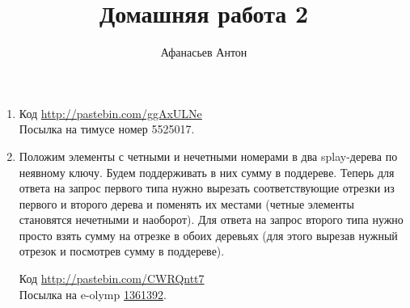 \documentclass[10pt]{article}
\begin{document}
\title{Домашняя работа 2}
\author{Афанасьев Антон}
\maketitle

\begin{enumerate}
	\item Код \url{http://pastebin.com/ggAxULNe} \\
	Посылка на тимусе номер 5525017.
	
	\item Положим элементы с четными и нечетными номерами в два splay-дерева по неявному ключу. Будем поддерживать в них сумму в поддереве. Теперь для ответа на запрос первого типа нужно вырезать соответствующие отрезки из первого и второго дерева и поменять их местами (четные элементы становятся нечетными и наоборот). Для ответа на запрос второго типа нужно просто взять сумму на отрезке в обоих деревьях (для этого вырезав нужный отрезок и посмотрев сумму в поддереве).
	
	Код \url{http://pastebin.com/CWRQntt7}\\
	Посылка на e-olymp \href{http://www.e-olimp.com/solutions/1361392}{1361392}.
	

\end{enumerate}
\end{document}
